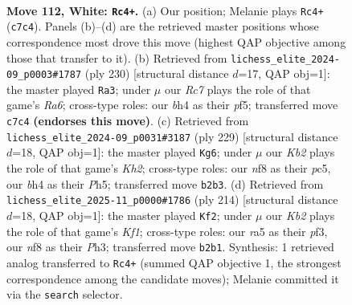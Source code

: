 \documentclass[11pt]{article}
\begin{document}
\clearpage

\begin{figure}[p]\centering
\begin{subfigure}{0.46\textwidth}\centering
\resizebox{\linewidth}{!}{%
\newchessgame
\chessboard[
  setfen={5n2/2R5/7p/r3p3/6kb/3p4/1K6/8 w - - 20 112},
  showmover=false,
  pgfstyle=straightmove, color=movearrow, markmove={c7-c4}
]}
\caption{}
\end{subfigure}\hfill
\begin{subfigure}{0.46\textwidth}\centering
\resizebox{\linewidth}{!}{%
\newchessgame
\chessboard[
  setfen={8/8/R7/5pk1/8/5p2/7r/4K3 w - - 88 116},
  showmover=false,
  pgfstyle=straightmove, color=movearrow, markmove={a6-a3}
]}
\caption{}
\end{subfigure}
\\[4pt]
\begin{subfigure}{0.46\textwidth}\centering
\resizebox{\linewidth}{!}{%
\newchessgame
\chessboard[
  setfen={5R2/7k/4r3/K1P4p/7B/6P1/6b1/8 b - - 46 115},
  showmover=false,
  pgfstyle=straightmove, color=movearrow, markmove={h7-g6}
]}
\caption{}
\end{subfigure}\hfill
\begin{subfigure}{0.46\textwidth}\centering
\resizebox{\linewidth}{!}{%
\newchessgame
\chessboard[
  setfen={8/1B6/3r2b1/8/5k1p/5p1P/8/5K2 w - - 0 108},
  showmover=false,
  pgfstyle=straightmove, color=movearrow, markmove={f1-f2}
]}
\caption{}
\end{subfigure}
\caption{\textbf{Move 112, White: \texttt{Rc4+}.} (a) Our position; Melanie plays \texttt{Rc4+} (\texttt{c7c4}). Panels (b)--(d) are the retrieved master positions whose correspondence most drove this move (highest QAP objective among those that transfer to it). (b) Retrieved from \texttt{lichess\_elite\_2024-09\_p0003\#1787} (ply 230) [structural distance $d$=17, QAP obj=1]: the master played \texttt{Ra3}; under $\mu$ our \emph{Rc7} plays the role of that game's \emph{Ra6}; cross-type roles: our \emph{b}h4 as their \emph{p}f5; transferred move \texttt{c7c4} \textbf{(endorses this move)}. (c) Retrieved from \texttt{lichess\_elite\_2024-09\_p0031\#3187} (ply 229) [structural distance $d$=18, QAP obj=1]: the master played \texttt{Kg6}; under $\mu$ our \emph{Kb2} plays the role of that game's \emph{Kh2}; cross-type roles: our \emph{n}f8 as their \emph{p}c5, our \emph{b}h4 as their \emph{P}h5; transferred move \texttt{b2b3}. (d) Retrieved from \texttt{lichess\_elite\_2025-11\_p0000\#1786} (ply 214) [structural distance $d$=18, QAP obj=1]: the master played \texttt{Kf2}; under $\mu$ our \emph{Kb2} plays the role of that game's \emph{Kf1}; cross-type roles: our \emph{r}a5 as their \emph{p}f3, our \emph{n}f8 as their \emph{P}h3; transferred move \texttt{b2b1}. Synthesis: 1 retrieved analog transferred to \texttt{Rc4+} (summed QAP objective 1, the strongest correspondence among the candidate moves); Melanie committed it via the \texttt{search} selector.}
\label{fig:thought-m222}
\end{figure}
\end{document}
